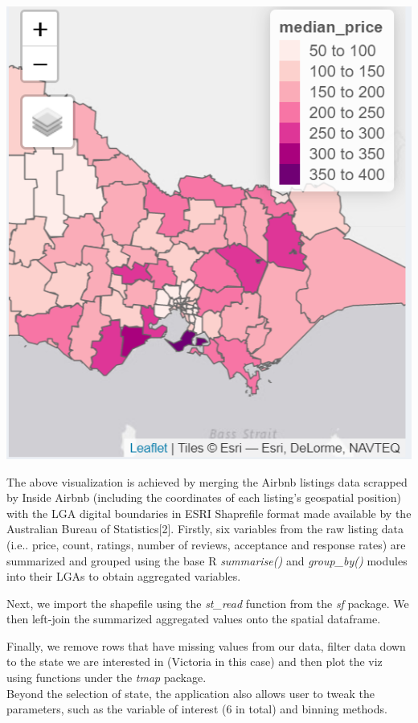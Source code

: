 \documentclass{acm_proc_article-sp}
\begin{document}
\includegraphics{images/geo1.png}

The above visualization is achieved by merging the Airbnb listings data
scrapped by Inside Airbnb (including the coordinates of each listing's
geospatial position) with the LGA digital boundaries in ESRI Shaprefile
format made available by the Australian Bureau of Statistics{[}2{]}.
Firstly, six variables from the raw listing data (i.e.. price, count,
ratings, number of reviews, acceptance and response rates) are
summarized and grouped using the base R \emph{summarise()} and
\emph{group\_by()} modules into their LGAs to obtain aggregated
variables.

Next, we import the shapefile using the \emph{st\_read} function from
the \emph{sf} package. We then left-join the summarized aggregated
values onto the spatial dataframe.

Finally, we remove rows that have missing values from our data, filter
data down to the state we are interested in (Victoria in this case) and
then plot the viz using functions under the \emph{tmap} package.\\
Beyond the selection of state, the application also allows user to tweak
the parameters, such as the variable of interest (6 in total) and
binning methods.
\end{document}
